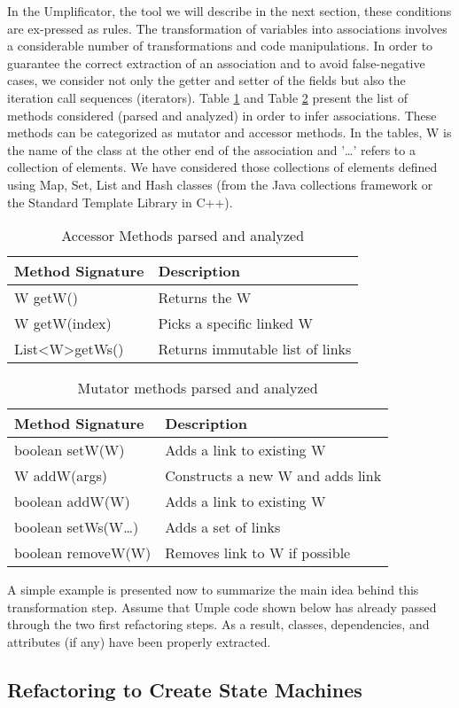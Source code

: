 In the Umplificator, the tool we will describe in the next section, these conditions are ex-pressed as rules. The transformation of variables into associations involves a considerable number of transformations and code manipulations. In order to guarantee the correct extraction of an association and to avoid false-negative cases, we consider not only the getter and setter of the fields but also the iteration call sequences (iterators). Table \ref{table:accessors} and Table \ref{table:mutators} present the list of methods considered (parsed and analyzed) in order to infer associations. These methods can be categorized as mutator and accessor methods. In the tables, W is the name of the class at the other end of the association and '…' refers to a collection of elements. We have considered those collections of elements defined using Map, Set, List and Hash classes (from the Java collections framework or the Standard Template Library in C++).

\begin{table}
\caption{Accessor Methods parsed and analyzed}
\label{table:accessors}
\centering
\begin{tabular}{ll}
\toprule
\rowcolor[HTML]{BBDAFF}
\textbf{Method Signature}   & \textbf{Description}                               \\ 
\hline
W getW()  		& Returns the W    \\ 
W getW(index)   & Picks a specific linked W   \\ 
List\textless W\textgreater getWs()   & Returns immutable list of links  \\ 
\hline
    \end{tabular}
\end{table}


\begin{table}
\caption{Mutator methods parsed and analyzed}
\label{table:mutators}
\centering
    \begin{tabular}{ll}
		\toprule
		\rowcolor[HTML]{BBDAFF}
        \textbf{Method Signature}   & \textbf{Description}    \\ 
        \hline
        boolean setW(W)   & Adds a link to existing W   		\\ 
        W addW(args)    & Constructs a new W and adds link      \\ 
        boolean addW(W)  & Adds a link to existing W            \\ 
        boolean setWs(W…)    & Adds a set of links              \\ 
        boolean removeW(W) &   Removes link to W if possible    \\
        \hline
    \end{tabular}
\end{table}
A simple example is presented now to summarize the main idea behind this transformation step. Assume that Umple code shown below has already passed through the two first refactoring steps. As a result, classes, dependencies, and attributes (if any) have been properly extracted. 

\subsection{Refactoring to Create State Machines}